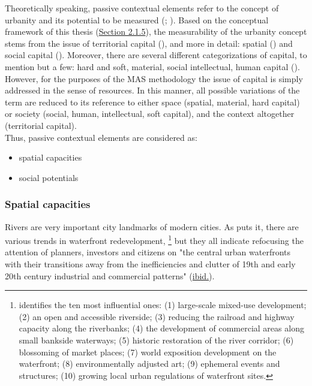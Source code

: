 \documentclass[11pt]{report}
\begin{document}
Theoretically speaking, passive contextual elements refer to the concept of urbanity and its potential to be measured (\href{ref}{\citealt{marcus_spatial_2007}}; \href{ref}{\citealt{vujosevic_postsocijalisticka_2010}}).
Based on the conceptual framework of this thesis (\href{Section 2.1.5}{Section 2.1.5}),
the measurability of the urbanity concept stems from the issue of territorial capital (\href{ref}{\citealt{camagni_regional_2013}}), and more in detail: spatial (\href{ref}{\citealt{marcus_spatial_2007}}) and social capital (\href{ref}{\citealt{golubovic_mrezna_2009}}).
Moreover, there are several different categorizations of capital, to mention but a few: hard and soft, material, social intellectual, human capital  (\href{ref}{\citealt{healey_collaborative_1997}}). %
\\

However, for the purposes of the MAS methodology the issue of capital is simply addressed in the sense of resources.
In this manner, all possible variations of the term are reduced to its reference to either space (spatial, material, hard capital) or society (social, human, intellectual, soft capital), and the context altogether (territorial capital).
\\

Thus, passive contextual elements are considered as:
\begin{itemize}
\item spatial capacities
\item social potentials
\end{itemize}

\subsubsection{Spatial capacities}

Rivers are very important city landmarks of modern cities. %
As \href{Mann1988}{\cite{mann_ten_1988}} puts it, there are various trends in waterfront redevelopment,
\footnote{\href{Mann1988}{\cite{mann_ten_1988}} identifies the ten most influential ones:
(1) large-scale mixed-use development;
(2) an open and accessible riverside;
(3) reducing the railroad and highway capacity along the riverbanks;
(4) the development of commercial areas along small bankside waterways; 
(5) historic restoration of the river corridor;
(6) blossoming of market places;
(7) world exposition development on the waterfront;
(8) environmentally adjusted art;
(9) ephemeral events and structures;
(10) growing local urban regulations of waterfront sites.}
but they all indicate refocusing the attention of planners, investors and citizens on "the central urban waterfronts with their transitions away from the inefficiencies and clutter of 19th and early 20th century industrial and commercial patterns" (\href{Mann1988}{ibid.}).
\\
\end{document}
